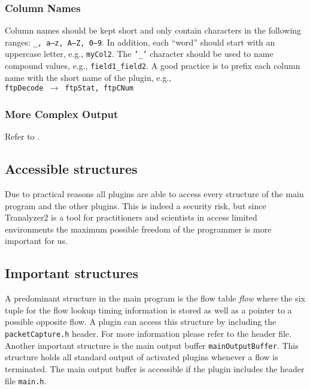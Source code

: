 \documentclass[documentation]{subfiles}
\begin{document}
\subsubsection{Column Names}
Column names should be kept short and only contain characters in the following ranges: {\tt \_, a--z, A--Z, 0--9}.
In addition, each ``word'' should start with an uppercase letter, e.g., {\tt myCol2}.
The {\tt '\_'} character should be used to name compound values, e.g., {\tt field1\_field2}.
A good practice is to prefix each column name with the short name of the plugin, e.g.,\\{\tt ftpDecode $\rightarrow$ ftpStat, ftpCNum}

\subsubsection{More Complex Output}
Refer to .

\subsection{Accessible structures}
Due to practical reasons all plugins are able to access every structure of the main program and the other plugins. This is indeed a security risk, but since Tranalyzer2 is a tool for practitioners and scientists in access limited environments the maximum possible freedom of the programmer is more important for us.

\subsection{Important structures}
A predominant structure in the main program is the flow table {\em flow} where the six tuple for the flow lookup timing information is stored as well as a pointer to a possible opposite flow. A plugin can access this structure by including the {\tt packetCapture.h} header. For more information please refer to the header file.\\
Another important structure is the main output buffer {\tt mainOutputBuffer}. This structure holds all standard output of activated plugins whenever a flow is terminated. The main output buffer is accessible if the plugin includes the header file {\tt main.h}.
\end{document}
